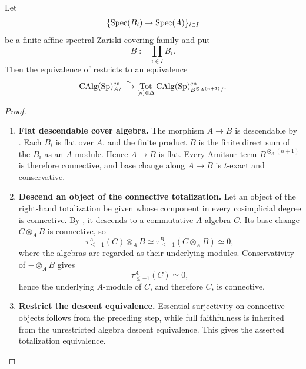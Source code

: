 \begin{corollary}
\label{cor:connective-zariski-algebra-descent}
Let
\[
    \{\operatorname{Spec}(B_i)\to\operatorname{Spec}(A)\}_{i\in I}
\]
be a finite affine spectral Zariski covering family and put
\[
    B
    :=
    \prod_{i\in I}B_i.
\]
Then the equivalence of
 restricts to an equivalence
\[
    \operatorname{CAlg}(\operatorname{Sp})^{\mathrm{cn}}_{A/}
    \xrightarrow{\simeq}
    \operatorname*{Tot}_{[n]\in\Delta}
    \operatorname{CAlg}(\operatorname{Sp})^{\mathrm{cn}}_
    {B^{\otimes_A(n+1)}/}.
\]
\end{corollary}

\begin{proof}
\leavevmode
\begin{enumerate}[label=\textup{(\arabic*)}]
    \item \textbf{Flat descendable cover algebra.}
    The morphism \(A\to B\) is descendable by
    . Each \(B_i\) is flat over
    \(A\), and the finite product \(B\) is the finite direct sum of the
    \(B_i\) as an \(A\)-module. Hence \(A\to B\) is flat. Every Amitsur term
    \(B^{\otimes_A(n+1)}\) is therefore connective, and base change along
    \(A\to B\) is \(t\)-exact and conservative.

    \item \textbf{Descend an object of the connective totalization.}
    Let an object of the right-hand totalization be given whose component in
    every cosimplicial degree is connective. By
    , it descends to a commutative
    \(A\)-algebra \(C\). Its base change \(C\otimes_AB\) is connective, so
    \[
        \tau_{\leq-1}^{A}(C)\otimes_AB
        \simeq
        \tau_{\leq-1}^{B}(C\otimes_AB)
        \simeq0,
    \]
    where the algebras are regarded as their underlying modules.
    Conservativity of \(-\otimes_AB\) gives
    \[
        \tau_{\leq-1}^{A}(C)\simeq0,
    \]
    hence the underlying \(A\)-module of \(C\), and therefore \(C\), is
    connective.

    \item \textbf{Restrict the descent equivalence.}
    Essential surjectivity on connective objects follows from the preceding
    step, while full faithfulness is inherited from the unrestricted algebra
    descent equivalence. This gives the asserted totalization equivalence.
\end{enumerate}
\end{proof}

